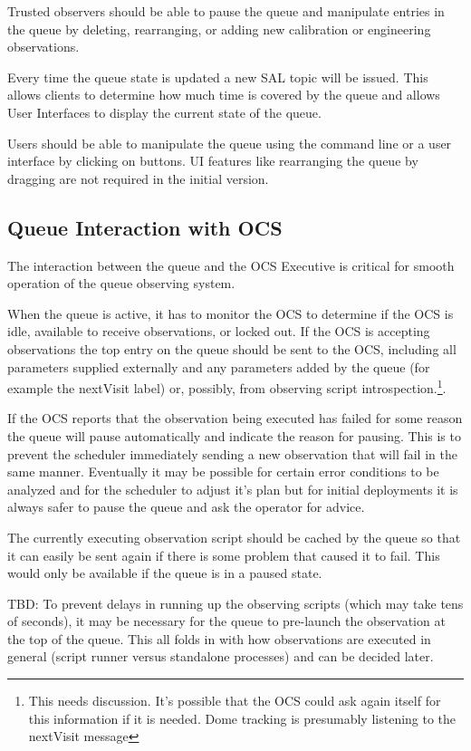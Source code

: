 \documentclass[TS,toc,lsstdraft]{lsstdoc}
\begin{document}
Trusted observers should be able to pause the queue and manipulate entries in the queue by deleting, rearranging, or adding new calibration or engineering observations.

Every time the queue state is updated a new SAL topic will be issued.
This allows clients to determine how much time is covered by the queue and allows User Interfaces to display the current state of the queue.

Users should be able to manipulate the queue using the command line or a user interface by clicking on buttons.
UI features like rearranging the queue by dragging are not required in the initial version.

\subsection{Queue Interaction with OCS}

The interaction between the queue and the OCS Executive is critical for smooth operation of the queue observing system.

When the queue is active, it has to monitor the OCS to determine if the OCS is idle, available to receive observations, or locked out.
If the OCS is accepting observations the top entry on the queue should be sent to the OCS, including all parameters supplied externally and any parameters added by the queue (for example the nextVisit label) or, possibly, from observing script introspection.\footnote{This needs discussion. It's possible that the OCS could ask again itself for this information if it is needed. Dome tracking is presumably listening to the nextVisit message}.

If the OCS reports that the observation being executed has failed for some reason the queue will pause automatically and indicate the reason for pausing.
This is to prevent the scheduler immediately sending a new observation that will fail in the same manner.
Eventually it may be possible for certain error conditions to be analyzed and for the scheduler to adjust it's plan but for initial deployments it is always safer to pause the queue and ask the operator for advice.

The currently executing observation script should be cached by the queue so that it can easily be sent again if there is some problem that caused it to fail.
This would only be available if the queue is in a paused state.

TBD: To prevent delays in running up the observing scripts (which may take tens of seconds), it may be necessary for the queue to pre-launch the observation at the top of the queue.
This all folds in with how observations are executed in general (script runner versus standalone processes) and can be decided later.
\end{document}
